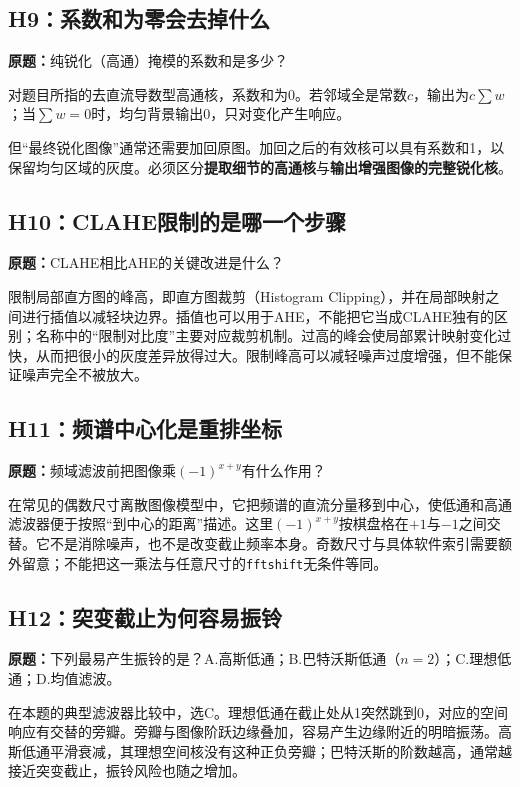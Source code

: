 \subsection{H9：系数和为零会去掉什么}
\label{original:H9}
\textbf{原题：}纯锐化（高通）掩模的系数和是多少？

对题目所指的去直流导数型高通核，系数和为0。若邻域全是常数$c$，输出为$c\sum w$；当$\sum w=0$时，均匀背景输出0，只对变化产生响应。

但“最终锐化图像”通常还需要加回原图。加回之后的有效核可以具有系数和1，以保留均匀区域的灰度。必须区分\textbf{提取细节的高通核}与\textbf{输出增强图像的完整锐化核}。

\subsection{H10：CLAHE限制的是哪一个步骤}
\label{original:H10}
\textbf{原题：}CLAHE相比AHE的关键改进是什么？

限制局部直方图的峰高，即直方图裁剪（Histogram Clipping），并在局部映射之间进行插值以减轻块边界。插值也可以用于AHE，不能把它当成CLAHE独有的区别；名称中的“限制对比度”主要对应裁剪机制。过高的峰会使局部累计映射变化过快，从而把很小的灰度差异放得过大。限制峰高可以减轻噪声过度增强，但不能保证噪声完全不被放大。

\subsection{H11：频谱中心化是重排坐标}
\label{original:H11}
\textbf{原题：}频域滤波前把图像乘$(-1)^{x+y}$有什么作用？

在常见的偶数尺寸离散图像模型中，它把频谱的直流分量移到中心，使低通和高通滤波器便于按照“到中心的距离”描述。这里$(-1)^{x+y}$按棋盘格在$+1$与$-1$之间交替。它不是消除噪声，也不是改变截止频率本身。奇数尺寸与具体软件索引需要额外留意；不能把这一乘法与任意尺寸的\texttt{fftshift}无条件等同。

\subsection{H12：突变截止为何容易振铃}
\label{original:H12}
\textbf{原题：}下列最易产生振铃的是？A.高斯低通；B.巴特沃斯低通（$n=2$）；C.理想低通；D.均值滤波。

在本题的典型滤波器比较中，选C。理想低通在截止处从1突然跳到0，对应的空间响应有交替的旁瓣。旁瓣与图像阶跃边缘叠加，容易产生边缘附近的明暗振荡。高斯低通平滑衰减，其理想空间核没有这种正负旁瓣；巴特沃斯的阶数越高，通常越接近突变截止，振铃风险也随之增加。

